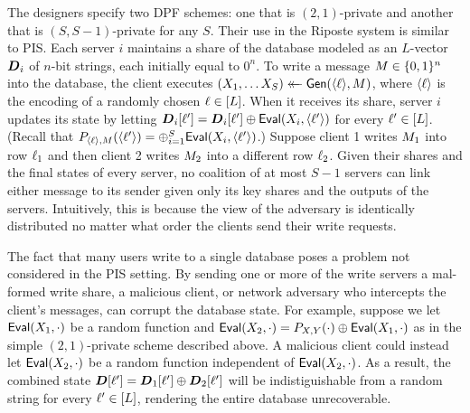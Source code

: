 The designers specify two DPF schemes: one that is $(2,1)$-private and another
that is $(S, S-1)$-private for any $S$. Their use in the
Riposte system is similar to PIS. Each server $i$ maintains a share of the
database modeled as an $L$-vector $\dbst_i$ of $n$-bit strings, each
initially equal to $0^n$. To write a message $M \in \{0,1\}^n$ into the
database, the client executes $(X_1, \ldots X_S) \getsr \gen(\str(\idx),
\msg)$, where $\str(\idx)$ is the encoding of a randomly chosen
$\ell\in[L]$. When it receives its share, server $i$ updates its state by
letting $\dbst_i[\idx^\prime] = \dbst_i[\idx^\prime] \xor \eval(X_i,
\str(\idx^\prime))$ for every $\ell^\prime\in[L]$. (Recall that
$P_{\str(\idx),\msg}(\str(\idx^\prime)) = \xor_{i=1}^S \eval(X_i,
\str(\idx^\prime))$.) Suppose client 1 writes $M_1$ into row $\ell_1$ and
then client 2 writes $M_2$ into a different row $\ell_2$.  Given their shares
and the final states of every server, no coalition of at most $S-1$
servers can link either message to its sender given only its key shares and the
outputs of the servers. Intuitively, this is because the view of the adversary
is identically distributed no matter what order the clients send their write
requests.

The fact that many users write to a single database poses a problem not
considered in the PIS setting. By sending one or more of the write servers a
mal-formed write share, a malicious client, or network adversary who intercepts
the client's messages, can corrupt the database state.
%
For example, suppose we let $\mathsf{Eval}(X_1, \cdot)$ be a random function and
$\mathsf{Eval}(X_2, \cdot) = P_{X,Y}(\cdot) \mathbin{\oplus} \mathsf{Eval}(X_1, \cdot)$ as in the simple
$(2,1)$-private scheme described above.
%
A malicious client could instead let $\mathsf{Eval}(X_2, \cdot)$ be a random function
independent of $\mathsf{Eval}(X_2, \cdot)$.
As a result, the combined state $\dbst[\idx^\prime] = \dbst_1[\idx^\prime] \xor
\dbst_2[\idx^\prime]$ will be indistiguishable from a random string for every
$\ell^\prime \in[L]$, rendering the entire database unrecoverable.

